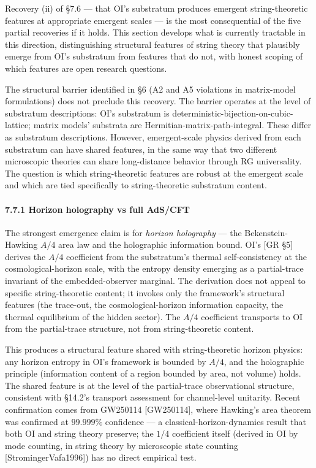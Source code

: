 \documentclass[
]{article}
\begin{document}
Recovery (ii) of §7.6 --- that OI's substratum produces emergent
string-theoretic features at appropriate emergent scales --- is the most
consequential of the five partial recoveries if it holds. This section
develops what is currently tractable in this direction, distinguishing
structural features of string theory that plausibly emerge from OI's
substratum from features that do not, with honest scoping of which
features are open research questions.

The structural barrier identified in §6 (A2 and A5 violations in
matrix-model formulations) does not preclude this recovery. The barrier
operates at the level of substratum descriptions: OI's substratum is
deterministic-bijection-on-cubic-lattice; matrix models' substrata are
Hermitian-matrix-path-integral. These differ as substratum descriptions.
However, emergent-scale physics derived from each substratum can have
shared features, in the same way that two different microscopic theories
can share long-distance behavior through RG universality. The question
is which string-theoretic features are robust at the emergent scale and
which are tied specifically to string-theoretic substratum content.

\hypertarget{horizon-holography-vs-full-adscft}{%
\paragraph{7.7.1 Horizon holography vs full
AdS/CFT}\label{horizon-holography-vs-full-adscft}}

The strongest emergence claim is for \emph{horizon holography} --- the
Bekenstein-Hawking \(A/4\) area law and the holographic information
bound. OI's {[}GR §5{]} derives the \(A/4\) coefficient from the
substratum's thermal self-consistency at the cosmological-horizon scale,
with the entropy density emerging as a partial-trace invariant of the
embedded-observer marginal. The derivation does not appeal to specific
string-theoretic content; it invokes only the framework's structural
features (the trace-out, the cosmological-horizon information capacity,
the thermal equilibrium of the hidden sector). The \(A/4\) coefficient
transports to OI from the partial-trace structure, not from
string-theoretic content.

This produces a structural feature shared with string-theoretic horizon
physics: any horizon entropy in OI's framework is bounded by \(A/4\),
and the holographic principle (information content of a region bounded
by area, not volume) holds. The shared feature is at the level of the
partial-trace observational structure, consistent with §14.2's transport
assessment for channel-level unitarity. Recent confirmation comes from
GW250114 {[}GW250114{]}, where Hawking's area theorem was confirmed at
\(99.999\%\) confidence --- a classical-horizon-dynamics result that
both OI and string theory preserve; the \(1/4\) coefficient itself
(derived in OI by mode counting, in string theory by microscopic state
counting {[}StromingerVafa1996{]}) has no direct empirical test.
\end{document}
